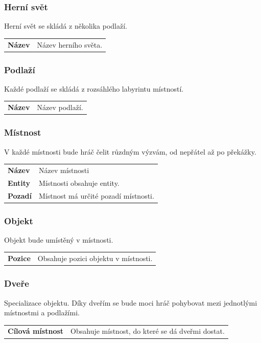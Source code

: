 \documentclass[12pt,a4paper]{article}
\begin{document}
\subsubsection{Herní svět}
Herní svět se skládá z několika podlaží.\\[5pt]

\begin{tabular*}{0.4\textwidth}{ll}
  \bf Název & Název herního světa.\\[7pt]
\end{tabular*}

\subsubsection{Podlaží}
Každé podlaží se skládá z rozsáhlého labyrintu místností. \\[5pt]

\begin{tabular*}{0.4\textwidth}{ll}
  \bf Název & Název podlaží.\\[7pt]
\end{tabular*}

\subsubsection{Místnost}
V každé místnosti bude hráč čelit růzdným výzvám, od nepřátel až po
překážky.\\[5pt]

\begin{tabular*}{0.55\textwidth}{ll}
  \bf Název & Název místnosti \\[7pt]
  \bf Entity & Místnosti obsahuje entity. \\[7pt]
  \bf Pozadí & Místnost má určité pozadí místnosti.\\[7pt]
\end{tabular*}

\subsubsection{Objekt}
Objekt bude umístěný v místnosti.\\[5pt]
\begin{tabular*}{0.55\textwidth}{ll}
  \bf Pozice & Obsahuje pozici objektu v místnosti.\\[7pt]
\end{tabular*}

\subsubsection{Dveře}
Specializace objektu. Díky dveřím se bude moci hráč pohybovat mezi jednotlými
místnostmi a podlažími.\\[5pt]
\begin{tabular*}{0.87\textwidth}{ll}
  \bf Cílová místnost & Obsahuje místnost, do které se dá dveřmi dostat.
\end{tabular*}
\end{document}
